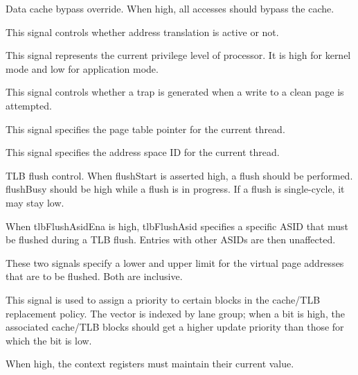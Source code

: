 \ifaceSubGroup{}
Data cache bypass override. When high, all accesses should bypass the cache.

\ifaceSubGroup{}
This signal controls whether address translation is active or not.

\ifaceSubGroup{}
This signal represents the current privilege level of processor. It is
high for kernel mode and low for application mode.

\ifaceSubGroup{}
This signal controls whether a trap is generated when a write to a clean
page is attempted.

\ifaceSubGroup{}
This signal specifies the page table pointer for the current thread.

\ifaceSubGroup{}
This signal specifies the address space ID for the current thread.

\ifaceSubGroup{}
TLB flush control. When flushStart is asserted high, a flush should be 
performed. flushBusy should be high while a flush is in progress. If a flush is 
single-cycle, it may stay low.

\ifaceSubGroup{}
When tlbFlushAsidEna is high, tlbFlushAsid specifies a specific ASID that must 
be flushed during a TLB flush. Entries with other ASIDs are then unaffected.

\ifaceSubGroup{}
These two signals specify a lower and upper limit for the virtual page
addresses that are to be flushed. Both are inclusive.

\ifaceSubGroup{}
This signal is used to assign a priority to certain blocks in the cache/TLB
replacement policy. The vector is indexed by lane group; when a bit is high, the
associated cache/TLB blocks should get a higher update priority than those for
which the bit is low.

\ifaceSubGroup{}
When high, the context registers must maintain their current value.

